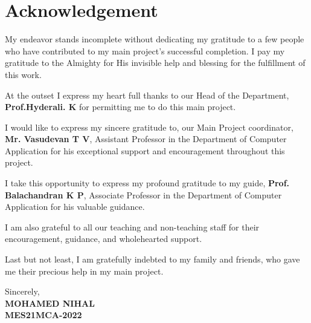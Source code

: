 \documentclass[12pt]{report}
\begin{document}
    
    

\chapter*{Acknowledgement}
\thispagestyle{empty}

My endeavor stands incomplete without dedicating my gratitude to a few people who have contributed to my main project's successful completion.\newline \newline
I pay my gratitude to the Almighty for His invisible help and blessing for the fulfillment of this work.\newline

At the outset I express my heart full thanks to our Head of the Department, \textbf{Prof.Hyderali. K} for permitting me to do this main project.\newline

I would like to express my sincere gratitude to, our Main Project coordinator,\textbf{ Mr. Vasudevan T V}, Assistant Professor in the Department of Computer Application for his exceptional support and encouragement throughout this project.\newline

I take this opportunity to express my profound gratitude to my guide, \textbf{Prof. Balachandran K P}, Associate Professor in the Department of Computer Application for his valuable guidance. \newline

I am also grateful to all our teaching and non-teaching staff for their encouragement, guidance, and wholehearted support.\newline

Last but not least, I am gratefully indebted to my family and friends, who gave me their precious help in my main project.

\vspace{0.5cm}

\begin{flushright}
Sincerely, \\
\textbf{MOHAMED NIHAL \\
MES21MCA-2022}\\
\end{flushright}

\end{document}
